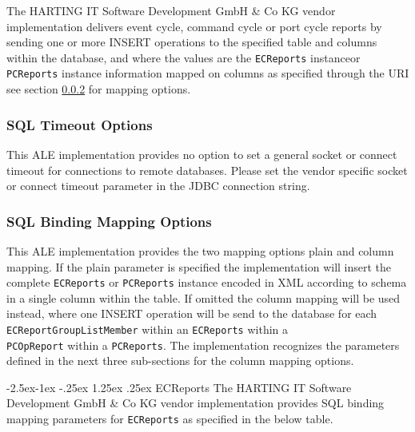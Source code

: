 \documentclass[11pt,a4paper,oneside]{article}
\makeatletter
\newif\ifincludecc
\renewcommand\paragraph{\@startsection{paragraph}{4}{\z@}%
            {-2.5ex\@plus -1ex \@minus -.25ex}%
            {1.25ex \@plus .25ex}%
            {\normalfont\normalsize\bfseries}}
\makeatother
\begin{document}
The HARTING IT Software Development GmbH \& Co KG vendor implementation delivers event cycle, command cycle or port cycle reports by sending one or more INSERT operations to the specified table and columns within the database, and where the values are the \texttt{ECReports} instance\ifincludecc , \texttt{CCReports} instance \fi or \texttt{PCReports} instance information mapped on columns as specified through the URI see section \ref{subsec: SQLB} for mapping options.

\subsubsection{SQL Timeout Options}
This ALE implementation provides no option to set a general socket or connect timeout for connections to remote databases. Please set the vendor specific socket or connect timeout parameter in the JDBC connection string.
\subsubsection{SQL Binding Mapping Options}
\label{subsec: SQLB}
This ALE implementation provides the two mapping options plain and column mapping. If the plain parameter is specified the implementation will insert the complete \texttt{ECReports\ifincludecc , CCReports \fi} or \texttt{PCReports} instance encoded in XML according to schema in a single column within the table. If omitted the column mapping will be used instead, where one INSERT operation will be send to the database for each\\
 \texttt{ECReportGroupListMember} within an \texttt{ECReports\ifincludecc , CCOpReport \fi} within a\\
\ifincludecc \texttt{CCReports} or \fi \texttt{PCOpReport} within a \texttt{PCReports}. The implementation recognizes the parameters defined in the next three sub-sections for the column mapping options.

\paragraph{ECReports}
The HARTING IT Software Development GmbH \& Co KG vendor implementation provides SQL binding mapping parameters for \texttt{ECReports} as specified in the below table. 
\end{document}
